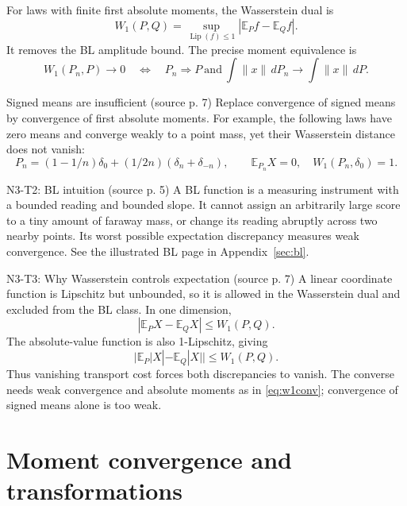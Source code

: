 \documentclass[12pt]{article}
\newcommand{\E}{\mathbb E}
\DeclareMathOperator{\Lip}{Lip}
\begin{document}
For laws with finite first absolute moments, the Wasserstein dual is
\begin{equation}
 W_1(P,Q)=\sup_{\Lip(f)\le1}|\E_P f-\E_Q f|.
\end{equation}
It removes the BL amplitude bound. The precise moment equivalence is
\begin{equation}\label{eq:w1conv}
 W_1(P_n,P)\to0
 \quad\Longleftrightarrow\quad
 P_n\Rightarrow P\ \text{and}\ \int\|x\|\,dP_n\to\int\|x\|\,dP.
\end{equation}
\begin{correctionbox}{Signed means are insufficient (source p. 7)}
Replace convergence of signed means by convergence of first absolute
moments. For example, the following laws have zero means and converge
weakly to a point mass, yet their Wasserstein distance does not vanish:
\begin{equation}
 P_n=(1-1/n)\delta_0+(1/2n)(\delta_n+\delta_{-n}),
 \qquad\E_{P_n}X=0,\quad W_1(P_n,\delta_0)=1.
\end{equation}
\end{correctionbox}
\begin{todobox}{N3-T2: BL intuition (source p. 5)}
A BL function is a measuring instrument with a bounded reading and bounded
slope. It cannot assign an arbitrarily large score to a tiny amount of
faraway mass, or change its reading abruptly across two nearby points.
Its worst possible expectation discrepancy measures weak convergence.
See the illustrated BL page in Appendix~\ref{sec:bl}.
\end{todobox}
\begin{todobox}{N3-T3: Why Wasserstein controls expectation (source p. 7)}
A linear coordinate function is Lipschitz but unbounded, so it is allowed
in the Wasserstein dual and excluded from the BL class. In one dimension,
\begin{equation}
 |\E_P X-\E_Q X|\le W_1(P,Q).
\end{equation}
The absolute-value function is also 1-Lipschitz, giving
\begin{equation}
 |\E_P|X|-\E_Q|X||\le W_1(P,Q).
\end{equation}
Thus vanishing transport cost forces both discrepancies to vanish.
The converse needs weak convergence and absolute moments as in
\eqref{eq:w1conv}; convergence of signed means alone is too weak.
\end{todobox}

\section{Moment convergence and transformations}
\end{document}
